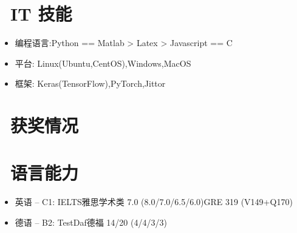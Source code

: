 \documentclass{resume}
\begin{document}
\section{\faCogs\ IT 技能}
\begin{itemize}[parsep=0.5ex]
  \item 编程语言:Python == Matlab > Latex > Javascript == C
  \item 平台: Linux(Ubuntu,CentOS),Windows,MacOS
  \item 框架: Keras(TensorFlow),PyTorch,Jittor
\end{itemize}

\section{\faHeartO\ 获奖情况}

\section{\faInfo\ 语言能力}
\begin{itemize}[parsep=0.5ex]
  \item 英语 -- C1: IELTS雅思学术类 7.0 (8.0/7.0/6.5/6.0)\qquad GRE 319 (V149+Q170)
  \item 德语 -- B2: TestDaf德福 14/20 (4/4/3/3)
\end{itemize}
\end{document}
